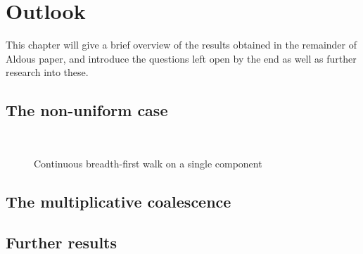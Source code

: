 
\chapter{Outlook} \label{C: outlook}

This chapter will give a brief overview of the results obtained in the remainder of Aldous paper,
and introduce the questions left open by the end as well as further research into these.

\section{The non-uniform case}

\begin{figure}[H]
	\centering
	\\
	
	\centering
	
	\caption{Continuous breadth-first walk on a single component}
	\label{F: inh bf-walk cont}
\end{figure} 


\section{The multiplicative coalescence}



\section{Further results}